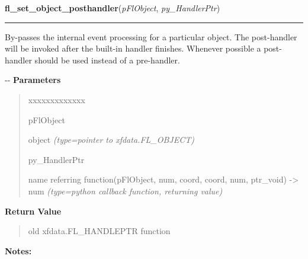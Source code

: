     \label{xformslib:flbasic:fl_set_object_posthandler}

    \vspace{0.5ex}

\hspace{.8\funcindent}\begin{boxedminipage}{\funcwidth}

    \raggedright \textbf{fl\_set\_object\_posthandler}(\textit{pFlObject}, \textit{py\_HandlerPtr})

    \vspace{-1.5ex}

    \rule{\textwidth}{0.5\fboxrule}
\setlength{\parskip}{2ex}

By-passes the internal event processing for a particular object. The
post-handler will be invoked after the built-in handler finishes. Whenever
possible a post-handler should be used instead of a pre-handler.

-{}-
\setlength{\parskip}{1ex}
      \textbf{Parameters}
      \vspace{-1ex}

      \begin{quote}
        \begin{Ventry}{xxxxxxxxxxxxx}

          \item[pFlObject]


object
            {\it (type=pointer to xfdata.FL\_OBJECT)}

          \item[py\_HandlerPtr]


name referring function(pFlObject, num, coord, coord, num,
ptr\_void) -> num
            {\it (type=python callback function, returning value)}

        \end{Ventry}

      \end{quote}

      \textbf{Return Value}
    \vspace{-1ex}

      \begin{quote}

old xfdata.FL\_HANDLEPTR function
      \end{quote}

\textbf{Notes:}
\begin{quote}
  \begin{itemize}


\end{itemize}
\end{quote}
\end{boxedminipage}
